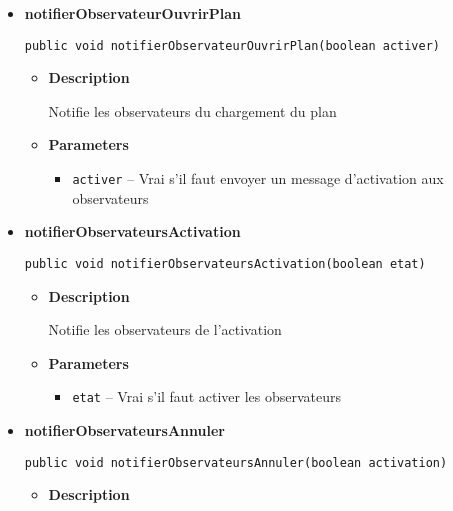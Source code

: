 \documentclass[11pt,a4paper]{report}
\begin{document}
{{{{{{\begin{itemize}
{\begin{itemize}
{Notifie les observateurs du plan
}
\item{
{\bf  Parameters}
  \begin{itemize}
   \item{
\texttt{activer} -- Vrai s'il faut envoyer un message d'activation aux observateurs}
  \end{itemize}
}%
\end{itemize}
}%
\item{ 
\hypertarget{controleur.ControleurDonnees.notifierObservateurOuvrirPlan(boolean)}{{\bf  notifierObservateurOuvrirPlan}\\}
\begin{lstlisting}[frame=none]
public void notifierObservateurOuvrirPlan(boolean activer)\end{lstlisting} %
\begin{itemize}
\item{
{\bf  Description}

Notifie les observateurs du chargement du plan
}
\item{
{\bf  Parameters}
  \begin{itemize}
   \item{
\texttt{activer} -- Vrai s'il faut envoyer un message d'activation aux observateurs}
  \end{itemize}
}%
\end{itemize}
}%
\item{ 
\hypertarget{controleur.ControleurDonnees.notifierObservateursActivation(boolean)}{{\bf  notifierObservateursActivation}\\}
\begin{lstlisting}[frame=none]
public void notifierObservateursActivation(boolean etat)\end{lstlisting} %
\begin{itemize}
\item{
{\bf  Description}

Notifie les observateurs de l'activation
}
\item{
{\bf  Parameters}
  \begin{itemize}
   \item{
\texttt{etat} -- Vrai s'il faut activer les observateurs}
  \end{itemize}
}%
\end{itemize}
}%
\item{ 
\hypertarget{controleur.ControleurDonnees.notifierObservateursAnnuler(boolean)}{{\bf  notifierObservateursAnnuler}\\}
\begin{lstlisting}[frame=none]
public void notifierObservateursAnnuler(boolean activation)\end{lstlisting} %
\begin{itemize}
\item{
{\bf  Description}

}
\end{itemize}}
\end{itemize}}}}}}}
\end{document}
